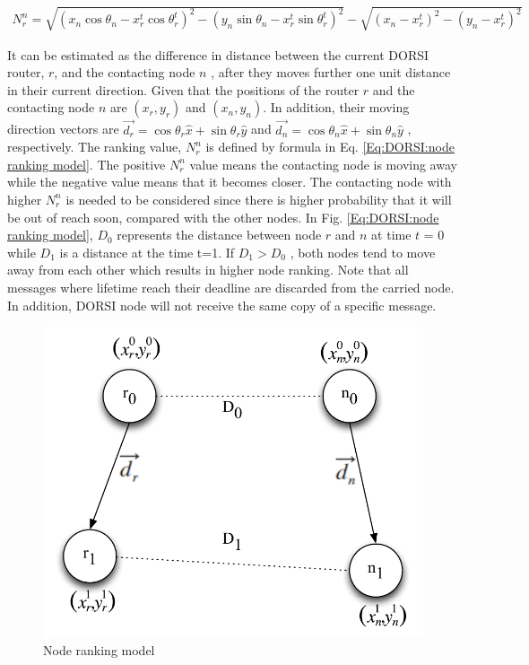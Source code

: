 \begin{eqnarray}
\label{Eq:DORSI:node ranking model}
{ N }_{ r }^{ n }=\sqrt { { ({ x }_{ n }\cos { { \theta  }_{ n } } -{ x }_{ r }^{ t }\cos { { \theta  }_{ r }^{ t } } ) }^{ 2 }-{ ({ y }_{ n }\sin { { \theta  }_{ n } } -{ x }_{ r }^{ t }\sin { { \theta  }_{ r }^{ t } } ) }^{ 2 } } -\sqrt { { ({ x }_{ n }-{ x }_{ r }^{ t }) }^{ 2 }-{ ({ y }_{ n }-{ x }_{ r }^{ t }) }^{ 2 } } 
\end{eqnarray}

It can be estimated as the difference in distance between the current DORSI router, $r$, and the contacting node $n$ , after they moves further one unit distance in their current direction. 
Given that the positions of the router $r$ and the contacting node $n$ are $(x_r,y_r)$ and $(x_n,y_n)$. 
In addition, their moving direction vectors are 
$\vec { { d }_{ r } } =\cos { { \theta  }_{ r } } \hat { x } +\sin { { \theta  }_{ r } } \hat { y } $
and
$\vec { { d }_{ n } } =\cos { { \theta  }_{ n } } \hat { x } +\sin { { \theta  }_{ n } } \hat { y } $
, respectively. 
The ranking value, $N_{r}^n$ is defined by formula in Eq. \ref{Eq:DORSI:node ranking model}. 
The positive $N_{r}^n$ value means the contacting node is moving away while the negative value means that it becomes closer. 
The contacting node with higher $N_{r}^n$ is needed to be considered since there is higher probability that it will be out of reach soon, compared with the other nodes. 
In Fig. \ref{Eq:DORSI:node ranking model}, $D_0$ represents the distance between node $r$ and $n$ at time $t$ = 0 while $D_1$ is a distance at the time t=1. 
If $D_1 > D_0$ , both nodes tend to move away from each other which results in higher node ranking.
Note that all messages where lifetime reach their deadline are discarded from the carried node. 
In addition, DORSI node will not receive the same copy of a specific message.

\begin{figure}[!t]
\centering
\includegraphics[width=4.5in]{Figures/NodeRankingModel.pdf}
\caption{Node ranking model}
\label{Node ranking model}
\end{figure}

